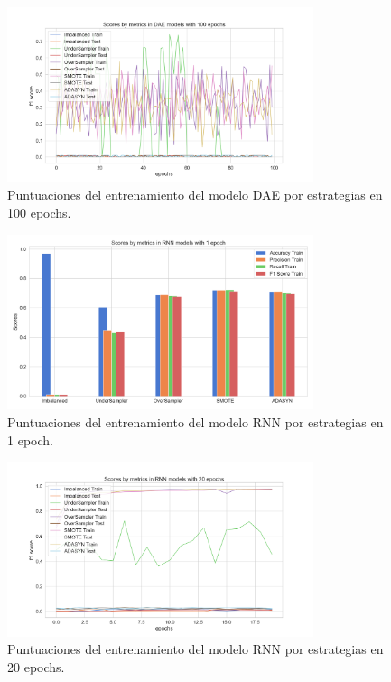 \begin{figure}[h!]
	\centering
	\includegraphics[width=0.8\textwidth]{"figuras/Experimento5/DAE/DAE_100_train"}
	\caption{Puntuaciones del entrenamiento del modelo DAE por estrategias en 100 epochs.}
	\label{an:38}
\end{figure}

\begin{figure}[h!]
	\centering
	\includegraphics[width=0.8\textwidth]{"figuras/Experimento5/RNN/RNN_1_train"}
	\caption{Puntuaciones del entrenamiento del modelo RNN por estrategias en 1 epoch.}
	\label{an:39}
\end{figure}

\begin{figure}[h!]
	\centering
	\includegraphics[width=0.8\textwidth]{"figuras/Experimento5/RNN/RNN_20_train"}
	\caption{Puntuaciones del entrenamiento del modelo RNN por estrategias en 20 epochs.}
	\label{an:40}
\end{figure}

